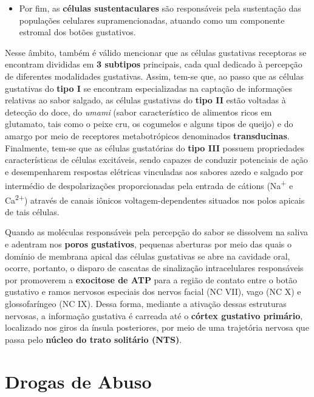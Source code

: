 \documentclass[
]{book}
\providecommand{\tightlist}{%
  \setlength{\itemsep}{0pt}\setlength{\parskip}{0pt}}
\begin{document}
\begin{itemize}
\tightlist
\item
  Por fim, as \textbf{células sustentaculares} são responsáveis pela sustentação das populações celulares supramencionadas, atuando como um componente estromal dos botões gustativos.
\end{itemize}

Nesse âmbito, também é válido mencionar que as células gustativas receptoras se encontram divididas em \textbf{3 subtipos} principais, cada qual dedicado à percepção de diferentes modalidades gustativas. Assim, tem-se que, ao passo que as células gustativas do \textbf{tipo I} se encontram especializadas na captação de informações relativas ao sabor salgado, as células gustativas do \textbf{tipo II} estão voltadas à detecção do doce, do \emph{umami} (sabor característico de alimentos ricos em glutamato, tais como o peixe cru, os cogumelos e alguns tipos de queijo) e do amargo por meio de receptores metabotrópicos denominados \textbf{transducinas}. Finalmente, tem-se que as células gustatórias do \textbf{tipo III} possuem propriedades características de células excitáveis, sendo capazes de conduzir potenciais de ação e desempenharem respostas elétricas vinculadas aos sabores azedo e salgado por intermédio de despolarizações proporcionadas pela entrada de cátions (Na\textsuperscript{+} e Ca\textsuperscript{2+}) através de canais iônicos voltagem-dependentes situados nos polos apicais de tais células.

Quando as moléculas responsáveis pela percepção do sabor se dissolvem na saliva e adentram nos \textbf{poros gustativos}, pequenas aberturas por meio das quais o domínio de membrana apical das células gustativas se abre na cavidade oral, ocorre, portanto, o disparo de cascatas de sinalização intracelulares responsáveis por promoverem a \textbf{exocitose de ATP} para a região de contato entre o botão gustativo e ramos nervosos especiais dos nervos facial (NC VII), vago (NC X) e glossofaríngeo (NC IX). Dessa forma, mediante a ativação dessas estruturas nervosas, a informação gustativa é carreada até o \textbf{córtex gustativo primário}, localizado nos giros da ínsula posteriores, por meio de uma trajetória nervosa que passa pelo \textbf{núcleo do trato solitário (NTS)}.

\hypertarget{drogas-de-abuso}{%
\chapter{Drogas de Abuso}\label{drogas-de-abuso}}
\end{document}

